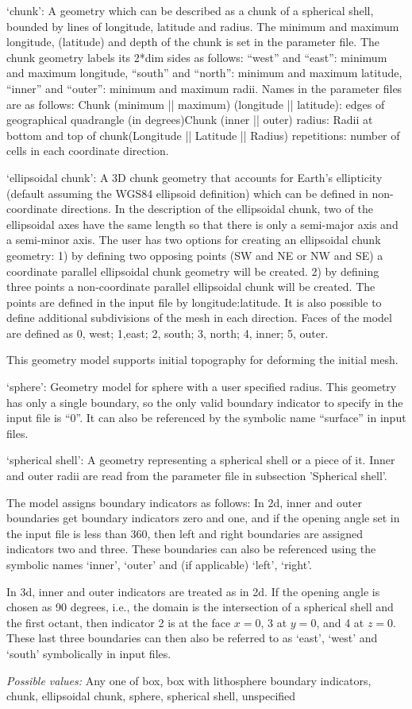 \begin{itemize}
`chunk': A geometry which can be described as a chunk of a spherical shell, bounded by lines of longitude, latitude and radius. The minimum and maximum longitude, (latitude) and depth of the chunk is set in the parameter file. The chunk geometry labels its 2*dim sides as follows: ``west'' and ``east'': minimum and maximum longitude, ``south'' and ``north'': minimum and maximum latitude, ``inner'' and ``outer'': minimum and maximum radii. Names in the parameter files are as follows: Chunk (minimum || maximum) (longitude || latitude): edges of geographical quadrangle (in degrees)Chunk (inner || outer) radius: Radii at bottom and top of chunk(Longitude || Latitude || Radius) repetitions: number of cells in each coordinate direction.

`ellipsoidal chunk': A 3D chunk geometry that accounts for Earth's ellipticity (default assuming the WGS84 ellipsoid definition) which can be defined in non-coordinate directions. In the description of the ellipsoidal chunk, two of the ellipsoidal axes have the same length so that there is only a semi-major axis and a semi-minor axis. The user has two options for creating an ellipsoidal chunk geometry: 1) by defining two opposing points (SW and NE or NW and SE) a coordinate parallel ellipsoidal chunk geometry will be created. 2) by defining three points a non-coordinate parallel ellipsoidal chunk will be created. The points are defined in the input file by longitude:latitude. It is also possible to define additional subdivisions of the mesh in each direction. Faces of the model are defined as 0, west; 1,east; 2, south; 3, north; 4, inner; 5, outer.

This geometry model supports initial topography for deforming the initial mesh.

`sphere': Geometry model for sphere with a user specified radius. This geometry has only a single boundary, so the only valid boundary indicator to specify in the input file is ``0''. It can also be referenced by the symbolic name ``surface'' in input files.

`spherical shell': A geometry representing a spherical shell or a piece of it. Inner and outer radii are read from the parameter file in subsection 'Spherical shell'.

The model assigns boundary indicators as follows: In 2d, inner and outer boundaries get boundary indicators zero and one, and if the opening angle set in the input file is less than 360, then left and right boundaries are assigned indicators two and three. These boundaries can also be referenced using the symbolic names `inner', `outer' and (if applicable) `left', `right'.

In 3d, inner and outer indicators are treated as in 2d. If the opening angle is chosen as 90 degrees, i.e., the domain is the intersection of a spherical shell and the first octant, then indicator 2 is at the face $x=0$, 3 at $y=0$, and 4 at $z=0$. These last three boundaries can then also be referred to as `east', `west' and `south' symbolically in input files.


{\it Possible values:} Any one of box, box with lithosphere boundary indicators, chunk, ellipsoidal chunk, sphere, spherical shell, unspecified
\end{itemize}
